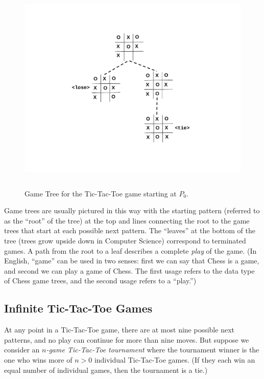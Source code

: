 \begin{definition}
\begin{figure}[htbp]
\centering
\includegraphics[height=4in]{figures/endgame.pdf}
\caption{Game Tree for the Tic-Tac-Toe game starting at $P_0$.}
\label{fig:endgame}
\end{figure}

Game trees are usually pictured in this way with the starting pattern
(referred to as the ``root'' of the tree) at the top and lines connecting
the root to the game trees that start at each
possible next pattern.  The ``leaves'' at the bottom of the tree (trees
grow upside down in Computer Science) correspond to terminated games.  A
path from the root to a leaf describes a complete \emph{play} of the game.
(In English, ``game'' can be used in two senses: first we can say that
Chess is a game, and second we can play a game of Chess.  The first usage
refers to the data type of Chess game trees, and the second usage refers to
a ``play.'')

\subsection{Infinite Tic-Tac-Toe Games}

At any point in a Tic-Tac-Toe game, there are at most nine possible next
patterns, and no play can continue for more than nine moves.  But suppose
we consider an \emph{$n$-game Tic-Tac-Toe tournament} where the tournament
winner is the one who wins more of $n>0$ individual Tic-Tac-Toe games.  (If
they each win an equal number of individual games, then the tournament is a
tie.)


\end{definition}
